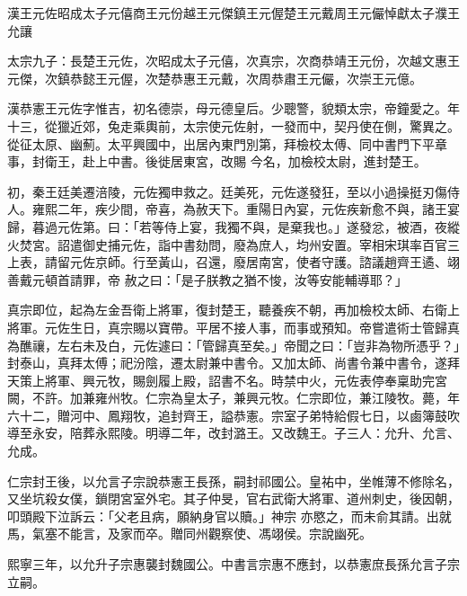 
\begin{pinyinscope}

 漢王元佐昭成太子元僖商王元份越王元傑鎮王元偓楚王元戴周王元儼悼獻太子濮王允讓



 太宗九子：長楚王元佐，次昭成太子元僖，次真宗，次商恭靖王元份，次越文惠王元傑，次鎮恭懿王元偓，次楚恭惠王元戴，次周恭肅王元儼，次崇王元億。



 漢恭憲王元佐字惟吉，初名德崇，母元德皇后。少聰警，貌類太宗，帝鐘愛之。年十三，從獵近郊，兔走乘輿前，太宗使元佐射，一發而中，契丹使在側，驚異之。從征太原、幽薊。太平興國中，出居內東門別第，拜檢校太傅、同中書門下平章事，封衛王，赴上中書。後徙居東宮，改賜
 今名，加檢校太尉，進封楚王。



 初，秦王廷美遷涪陵，元佐獨申救之。廷美死，元佐遂發狂，至以小過操挺刃傷侍人。雍熙二年，疾少間，帝喜，為赦天下。重陽日內宴，元佐疾新愈不與，諸王宴歸，暮過元佐第。曰：「若等侍上宴，我獨不與，是棄我也。」遂發忿，被酒，夜縱火焚宮。詔遣御史捕元佐，詣中書劾問，廢為庶人，均州安置。宰相宋琪率百官三上表，請留元佐京師。行至黃山，召還，廢居南宮，使者守護。諮議趙齊王遹、翊善戴元頓首請罪，帝
 赦之曰：「是子朕教之猶不悛，汝等安能輔導耶？」



 真宗即位，起為左金吾衛上將軍，復封楚王，聽養疾不朝，再加檢校太師、右衛上將軍。元佐生日，真宗賜以寶帶。平居不接人事，而事或預知。帝嘗遣術士管歸真為醮禳，左右未及白，元佐遽曰：「管歸真至矣。」帝聞之曰：「豈非為物所憑乎？」封泰山，真拜太傅；祀汾陰，遷太尉兼中書令。又加太師、尚書令兼中書令，遂拜天策上將軍、興元牧，賜劍履上殿，詔書不名。時禁中火，元佐表停奉稟助完宮
 闕，不許。加兼雍州牧。仁宗為皇太子，兼興元牧。仁宗即位，兼江陵牧。薨，年六十二，贈河中、鳳翔牧，追封齊王，謚恭憲。宗室子弟特給假七日，以鹵簿鼓吹導至永安，陪葬永熙陵。明導二年，改封潞王。又改魏王。子三人：允升、允言、允成。



 仁宗封王後，以允言子宗說恭憲王長孫，嗣封祁國公。皇祐中，坐帷薄不修除名，又坐坑殺女僕，鎖閉宮室外宅。其子仲旻，官右武衛大將軍、道州刺史，後因朝，叩頭殿下泣訴云：「父老且病，願納身官以贖。」神宗
 亦愍之，而未俞其請。出就馬，氣塞不能言，及家而卒。贈同州觀察使、馮翊侯。宗說幽死。



 熙寧三年，以允升子宗惠襲封魏國公。中書言宗惠不應封，以恭憲庶長孫允言子宗立嗣。




\end{pinyinscope}

